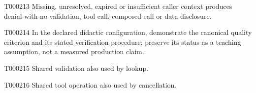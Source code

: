 \documentclass[11pt,a4paper]{article}
\begin{document}
\begin{atlasparagraph}{T000213}
Missing, unresolved, expired or insufficient caller context produces denial with no validation, tool call, composed call or data disclosure.
\end{atlasparagraph}
\begin{atlasparagraph}{T000214}
In the declared didactic configuration, demonstrate the canonical quality criterion and its stated verification procedure; preserve its status as a teaching assumption, not a measured production claim.
\end{atlasparagraph}
\begin{atlasparagraph}{T000215}
Shared validation also used by lookup.
\end{atlasparagraph}
\begin{atlasparagraph}{T000216}
Shared tool operation also used by cancellation.
\end{atlasparagraph}
\end{document}
